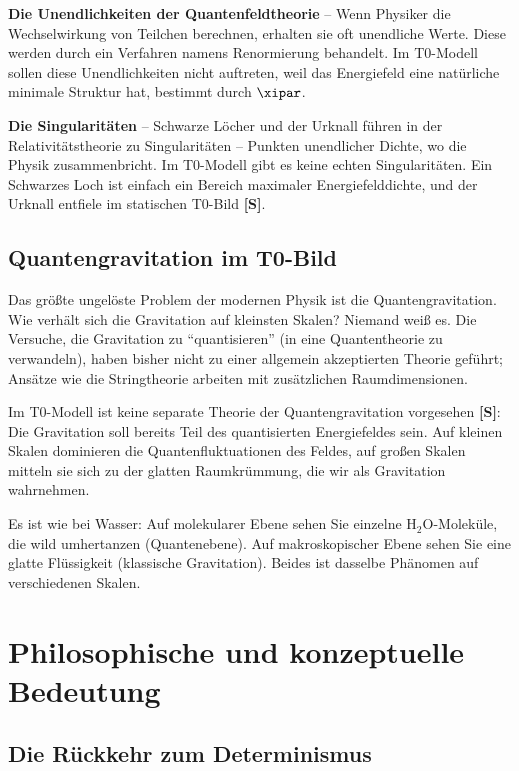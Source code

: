 	\textbf{Die Unendlichkeiten der Quantenfeldtheorie} -- Wenn Physiker die Wechselwirkung von Teilchen berechnen, erhalten sie oft unendliche Werte. Diese werden durch ein Verfahren namens Renormierung behandelt. Im T0-Modell sollen diese Unendlichkeiten nicht auftreten, weil das Energiefeld eine natürliche minimale Struktur hat, bestimmt durch $\xipar$.
	
	\textbf{Die Singularitäten} -- Schwarze Löcher und der Urknall führen in der Relativitätstheorie zu Singularitäten -- Punkten unendlicher Dichte, wo die Physik zusammenbricht. Im T0-Modell gibt es keine echten Singularitäten. Ein Schwarzes Loch ist einfach ein Bereich maximaler Energiefelddichte, und der Urknall entfiele im statischen T0-Bild \textbf{[S]}.
	
	\subsection{Quantengravitation im T0-Bild}
	
	Das größte ungelöste Problem der modernen Physik ist die Quantengravitation. Wie verhält sich die Gravitation auf kleinsten Skalen? Niemand weiß es. Die Versuche, die Gravitation zu ``quantisieren'' (in eine Quantentheorie zu verwandeln), haben bisher nicht zu einer allgemein akzeptierten Theorie geführt; Ansätze wie die Stringtheorie arbeiten mit zusätzlichen Raumdimensionen.
	
	\begin{important}
		Im T0-Modell ist keine separate Theorie der Quantengravitation vorgesehen \textbf{[S]}: Die Gravitation soll bereits Teil des quantisierten Energiefeldes sein. Auf kleinen Skalen dominieren die Quantenfluktuationen des Feldes, auf großen Skalen mitteln sie sich zu der glatten Raumkrümmung, die wir als Gravitation wahrnehmen.
		
		Es ist wie bei Wasser: Auf molekularer Ebene sehen Sie einzelne H$_2$O-Moleküle, die wild umhertanzen (Quantenebene). Auf makroskopischer Ebene sehen Sie eine glatte Flüssigkeit (klassische Gravitation). Beides ist dasselbe Phänomen auf verschiedenen Skalen.
	\end{important}
	
	\section{Philosophische und konzeptuelle Bedeutung}
	
	\subsection{Die Rückkehr zum Determinismus}
	
